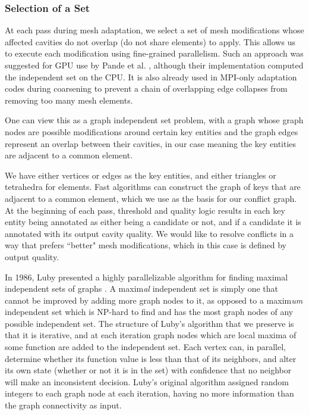 \subsubsection{Selection of a Set}

At each pass during mesh adaptation, we select a set of mesh modifications
whose affected cavities do not overlap (do not share elements) to apply.
This allows us to execute each modification using fine-grained parallelism.
Such an approach was suggested for GPU use by Pande et al. \cite{pandea2015gpu},
although their implementation computed the independent set on the CPU.
It is also already used in MPI-only adaptation codes \cite{de1999parallel}
during coarsening to prevent a chain of overlapping edge collapses
from removing too many mesh elements.

One can view this as a graph independent set problem, with a graph whose
graph nodes are possible modifications around certain key entities
and the graph edges represent an overlap between their cavities,
in our case meaning the key entities are adjacent to a common element.

We have either vertices or edges as the key entities, and either
triangles or tetrahedra for elements.
Fast algorithms can construct the graph of keys that are adjacent
to a common element, which we use as the basis for our conflict graph.
At the beginning of each pass, threshold and quality logic results
in each key entity being annotated as either being a candidate or
not, and if a candidate it is annotated with its output cavity quality.
We would like to resolve conflicts in a way that prefers ``better" mesh
modifications, which in this case is defined by output quality.

In 1986, Luby presented a highly parallelizable algorithm
for finding maximal independent sets of graphs \cite{luby1986simple}.
A maxim\emph{al} independent set is simply one that cannot be improved by
adding more graph nodes to it, as opposed to a maxim\emph{um} independent
set which is NP-hard to find and has the most graph nodes of any
possible independent set.
The structure of Luby's algorithm that we preserve is that it is iterative,
and at each iteration graph nodes which are local maxima of some function
are added to the independent set.
Each vertex can, in parallel, determine whether its function value is
less than that of its neighbors, and alter its own state (whether or not it is in the set)
with confidence that no neighbor will make an inconsistent decision.
Luby's original algorithm assigned random integers to each graph node
at each iteration, having no more information than the graph connectivity as input.

